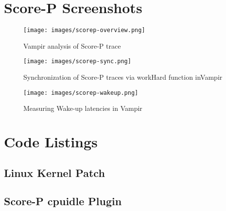 \section*{Score-P Screenshots}

\begin{figure}[h!]
\centering
 \texttt{[image: images/scorep-overview.png]}
 \caption{Vampir analysis of Score-P trace}
 \label{fig:fig_over}
\end{figure}

\begin{figure}[h!]
\centering
 \texttt{[image: images/scorep-sync.png]}
 \caption{Synchronization of Score-P traces via workHard function inVampir}
 \label{fig:fig_sync}
\end{figure}

\begin{figure}[h!]
\centering
 \texttt{[image: images/scorep-wakeup.png]}
 \caption{Measuring Wake-up latencies in Vampir}
 \label{fig:fig_wake}
\end{figure}


\newpage
\section*{Code Listings}

\subsection*{Linux Kernel Patch}

%







\subsection*{Score-P cpuidle Plugin}

